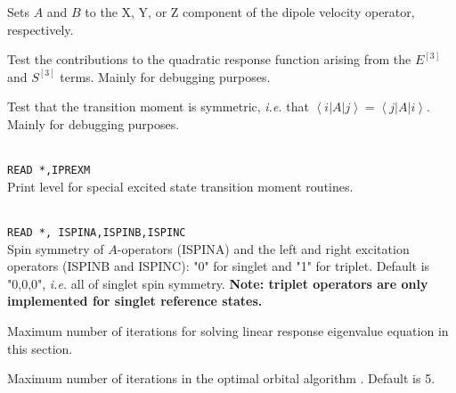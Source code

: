 \begin{description}
\item{}
Sets $A$ and $B$ to the X, Y, or Z component of the dipole velocity
operator, respectively.

\item{}
Test the contributions to the quadratic response function arising from
the $E^{\left[3\right]}$ and $S^{\left[3\right]}$ terms.  Mainly for
debugging purposes.

\item{}
Test that the transition moment is symmetric, {\it i.e.\/} that
$\left<i\left|A\right|j\right> =
\left<j\left|A\right|i\right>$. Mainly for debugging purposes.

\item{}\\
\verb|READ *,IPREXM|\\
Print level for special excited state transition moment routines.

\item{}\\
\verb|READ *, ISPINA,ISPINB,ISPINC|\\
Spin symmetry of $A$-operators (ISPINA)
and the left and right excitation operators (ISPINB and ISPINC):
"0" for singlet and "1" for triplet.
Default is "0,0,0", {\it i.e.\/} all of singlet spin symmetry.
{\bf Note: triplet operators are only implemented for singlet reference states.}


\item{}
Maximum number of iterations for solving linear response
eigenvalue equation in this section.

\item{}
Maximum number of iterations in the optimal
orbital algorithm
\cite{tuhjahjajpjjcp84}.
Default is 5.


\end{description}

